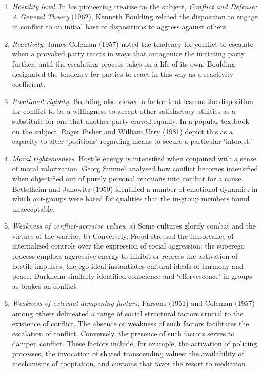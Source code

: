 \begin{enumerate}
\item \emph{Hostility level}. In his pioneering treatise on the subject, \emph{Conflict and Defense: A General Theory} (1962), Kenneth Boulding related the disposition to engage in conflict to an initial base of dispositions to aggress against others.
\item \emph{Reactivity}. James Coleman (1957) noted the tendency for conflict to escalate when a provoked party reacts in ways that antagonize the initiating party further, until the escalating process takes on a life of its own. Boulding designated the tendency for parties to react in this way as a reactivity coefficient.
\item \emph{Positional rigidity}. Boulding also viewed a factor that lessens the disposition for conflict to be a willingness to accept other satisfactory utilities as a substitute for one that another party craved equally. In a popular textbook on the subject, Roger Fisher and William Urry (1981) depict this as a capacity to alter `positions' regarding means to secure a particular `interest.'
\item \emph{Moral righteousness}. Hostile energy is intensified when conjoined with a sense of moral valorization. Georg Simmel analysed how conflict becomes intensified when objectified out of purely personal reactions into combat for a cause. Bettelheim and Janowitz (1950) identified a number of emotional dynamics in which out-groups were hated for qualities that the in-group members found unacceptable.
\item \emph{Weakness of conflict-aversive values}. a) Some cultures glorify combat and the virtues of the warrior. b) Conversely, Freud stressed the importance of internalized controls over the expression of social aggression: the superego process employs aggressive energy to inhibit or repress the activation of hostile impulses, the ego-ideal instantiates cultural ideals of harmony and peace. Durkheim similarly identified conscience and `effervescence' in groups as brakes on conflict.
\item \emph{Weakness of external dampening factors}. Parsons (1951) and Coleman (1957) among others delineated a range of social structural factors crucial to the existence of conflict. The absence or weakness of such factors facilitates the escalation of conflict. Conversely, the presence of such factors serves to dampen conflict. These factors include, for example, the activation of policing processes; the invocation of shared transcending values; the availability of mechanisms of cooptation, and customs that favor the resort to mediation.
\end{enumerate}

